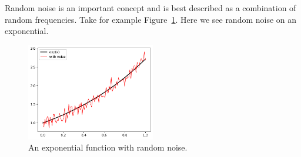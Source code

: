 \documentclass[10pt]{article}
\begin{document}
Random noise is an important concept and is best described as a combination of random frequencies.  Take for example Figure~\ref{fig:exp_with_noise}.  Here we see random noise on an exponential.
%
\begin{figure}[!ht]
  \centering
  \includegraphics[width=0.5\textwidth]{./figures/exp_with_noise.pdf}
  \caption{An exponential function with random noise.}\label{fig:exp_with_noise}
\end{figure}
\end{document}
